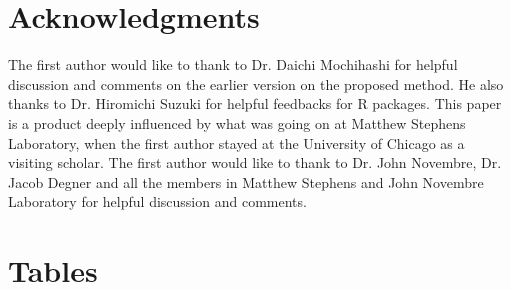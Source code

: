
\section*{Acknowledgments}

The first author would like to thank to Dr. Daichi Mochihashi for helpful discussion and comments on the earlier version on the proposed method.
He also thanks to Dr. Hiromichi Suzuki for helpful feedbacks for R packages.
This paper is a product deeply influenced by what was going on at Matthew Stephens Laboratory,
when the first author stayed at the University of Chicago as a visiting scholar.
The first author would like to thank to Dr. John Novembre,
Dr. Jacob Degner and all the members in Matthew Stephens and John Novembre Laboratory for helpful discussion and comments.


%
%
% 

% 




%

\newpage

 \section*{Tables}
% 
%
%




